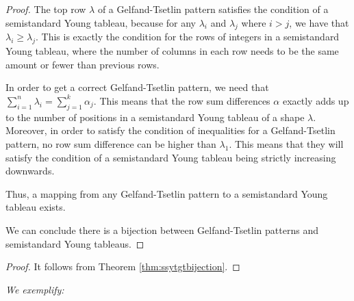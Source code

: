 \begin{proof}
			The top row $\lambda$ of a Gelfand-Tsetlin pattern satisfies the condition of a semistandard Young tableau, because for any $\lambda_i$ and $\lambda_j$ where $i > j$, we have that $\lambda_i \geq \lambda_j$. This is exactly the condition for the rows of integers in a semistandard Young tableau, where the number of columns in each row needs to be the same amount or fewer than previous rows. 
			
			In order to get a correct Gelfand-Tsetlin pattern, we need that $\sum_{i=1}^n \lambda_i = \sum_{j=1}^k \alpha_j$. This means that the row sum differences $\alpha$ exactly adds up to the number of positions in a semistandard Young tableau of a shape $\lambda$. Moreover, in order to satisfy the condition of inequalities for a Gelfand-Tsetlin pattern, no row sum difference can be higher than $\lambda_1$. This means that they will satisfy the condition of a semistandard Young tableau being strictly increasing downwards. 
			
			Thus, a mapping from any Gelfand-Tsetlin pattern to a semistandard Young tableau exists. 
			
			\bigskip
			
			We can conclude there is a bijection between Gelfand-Tsetlin patterns and semistandard Young tableaus.
		\end{proof}
		
		
		
		\begin{proof}It follows from Theorem \ref{thm:ssytgtbijection}.
		\end{proof}
		
		\bigskip
		
		\emph{
			We exemplify:		
		}
		
